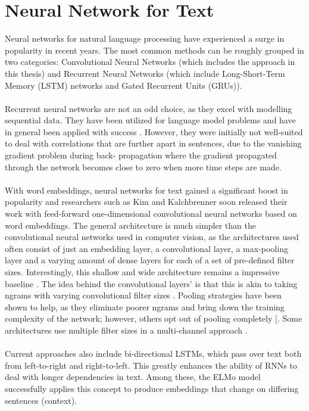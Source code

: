 \section{Neural Network for Text}
Neural networks for natural language processing have experienced a surge in popularity in recent years. The most common methods can be roughly grouped in two categories: Convolutional Neural Networks (which includes the approach in this thesis) and Recurrent Neural Networks (which include Long-Short-Term Memory (LSTM) networks and Gated Recurrent Units (GRUs)).\\
\\
Recurrent neural networks are not an odd choice, as they excel with modelling sequential data. They have been utilized for language model problems and have in general been applied with success \cite{Mikolov2010a, Chung2014, Lai2015, Howard2018, Xu}. However, they were initially not well-suited to deal with correlations that are further apart in sentences, due to the vanishing gradient problem during back- propagation where the gradient propagated through the network becomes close to zero when more time steps are made.\\ 
\\
With word embeddings, neural networks for text gained a significant boost in popularity and researchers such as Kim \cite{Kim2014} and Kalchbrenner\cite{Kalchbrenner2014} soon released their work with feed-forward one-dimensional convolutional neural networks based on word embeddings. The general architecture is much simpler than the convolutional neural networks used in computer vision, as the architectures used often consist of just an embedding layer, a convolutional layer, a max-pooling layer and a varying amount of dense layers for each of a set of pre-defined filter sizes. Interestingly, this shallow and wide architecture remains a impressive baseline \cite{Le2017}. The idea behind the convolutional layers’ is that this is akin to taking ngrams with varying convolutional filter sizes \cite{Zhang2015, Jacovi2018} . Pooling strategies have been shown to help, as they eliminate poorer ngrams and bring down the training complexity of the network; however, others opt out of pooling completely [\cite{Kim2014, Zhang2015}. Some architectures use multiple filter sizes in a multi-channel approach \cite{Kim2014,Liu2017,Goldberg2016}.\\
\\
Current approaches also include bi-directional LSTMs, which pass over text both from left-to-right \cite{Radford2018} and right-to-left. This greatly enhances the ability of RNNs to deal with longer dependencies in text. Among these, the ELMo model \cite{Peters2018} successfully applies this concept to produce embeddings that change on differing sentences (context).\\ 

